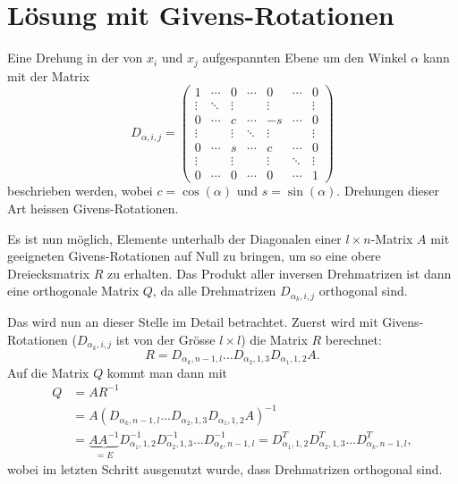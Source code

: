 %
%
%
\section{Lösung mit Givens-Rotationen
\label{qr:section:loesung}}
Eine Drehung in der von $x_i$ und $x_j$ aufgespannten Ebene um den Winkel $\alpha$ kann mit der Matrix
\begin{equation}
D_{\alpha,i,j}=
\begin{pmatrix}
1     &\cdots&0     &\cdots&0     &\cdots&0\\
\vdots&\ddots&\vdots&      &\vdots&      &\vdots\\
0     &\cdots&c     &\cdots&-s    &\cdots&0\\
\vdots&      &\vdots&\ddots&\vdots&      &\vdots\\
0     &\cdots&s     &\cdots&c     &\cdots&0\\
\vdots&      &\vdots&      &\vdots&\ddots&\vdots\\
0     &\cdots&0     &\cdots&0     &\cdots&1
\end{pmatrix}
\end{equation}
beschrieben werden, wobei $c=\cos(\alpha)$ und $s=\sin(\alpha)$.
Drehungen dieser Art heissen Givens-Rotationen.

Es ist nun möglich, Elemente unterhalb der Diagonalen einer $l\times n $-Matrix $A$ mit geeigneten Givens-Rotationen auf Null zu bringen, um so eine obere Dreiecksmatrix $R$ zu erhalten.
Das Produkt aller inversen Drehmatrizen ist dann eine orthogonale Matrix $Q$, da alle Drehmatrizen $D_{\alpha_k,i,j}$ orthogonal sind.

Das wird nun an dieser Stelle im Detail betrachtet.
Zuerst wird mit Givens-Rotationen ($D_{\alpha_k, i, j}$ ist von der Grösse $l\times l$) die Matrix $R$ berechnet: 
\begin{equation*}
R = D_{\alpha_k,n-1,l}...D_{\alpha_2,1,3}D_{\alpha_1,1,2}A.		
\end{equation*}
Auf die Matrix $Q$ kommt man dann mit
\begin{align*}
Q&=AR^{-1}\\&=A(D_{\alpha_k,n-1,l}...D_{\alpha_2,1,3}D_{\alpha_1,1,2}A)^{-1}\\&=
\underbrace{AA^{-1}}_{\displaystyle=E}D_{\alpha_1,1,2}^{-1}D_{\alpha_2,1,3}^{-1}... D_{\alpha_k, n-1,l}^{-1}=
D_{\alpha_1,1,2}^{T}D_{\alpha_2,1,3}^{T}...D_{\alpha_k, n-1,l}^{T},
\end{align*}
wobei im letzten Schritt ausgenutzt wurde, dass Drehmatrizen orthogonal sind.

